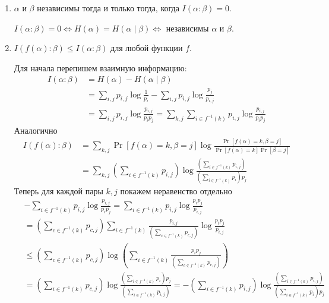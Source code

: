 \begin{prop}
\begin{enumerate}
		\item $  \alpha $ и $  \beta $ независимы тогда и только тогда, когда $ I( \alpha : \beta ) = 0$.
			\begin{proof*}
				$ I( \alpha : \beta ) = 0 \Longleftrightarrow H( \alpha ) = H( \alpha \mid \beta ) \Longleftrightarrow $ независимы $  \alpha $ и $ \beta $.
			\end{proof*}
		\item $ I( f( \alpha ) \colon \beta ) \le I ( \alpha : \beta )$ для любой функции $ f$.
		\begin{proof*}
		    Для начала перепишем взаимную информацию:
		    \begin{align*}
		        I(\alpha : \beta) &= H(\alpha) - H(\alpha \mid \beta) \\
		        &= \sum_{i,j}p_{i,j}\log\frac{1}{p_i} - \sum_{i,j}p_{i,j}\log\frac{p_j}{p_{i,j}} \\
		        &= \sum_{i,j} p_{i,j}\log\frac{p_{i,j}}{p_i p_j} = \sum_{k,j}\sum_{i\in f^{-1}(k)}p_{i,j}\log\frac{p_{i,j}}{p_i p_j}
		        \tag{сгруппировали с помощью прообразов}
		    \end{align*}
		    Аналогично
		    \begin{align*}
		        I(f(\alpha) : \beta) &= \sum_{k, j}\Pr[f(\alpha) = k, \beta = j]\log\frac{\Pr[f(\alpha) = k, \beta = j]}{\Pr[f(\alpha) = k]\Pr[\beta = j]}\\
		        &= \sum_{k,j}\left(\sum_{i \in f^{-1}(k)}p_{i,j}\right)\log\frac{\left(\sum_{i \in f^{-1}(k)}p_{i,j}\right)}{\left(\sum_{i \in f^{-1}(k)}p_{i}\right)p_j}
		    \end{align*}
		    Теперь для каждой пары $k,j$ покажем неравенство отдельно
		    \begin{align*}
		        &-\sum_{i\in f^{-1}(k)}p_{i,j}\log\frac{p_{i,j}}{p_i p_j} = \sum_{i\in f^{-1}(k)}p_{i,j}\log\frac{p_i p_j}{p_{i,j}}\\
		        &=\left(\sum_{c \in f^{-1}(k)}p_{c,j}\right)\sum_{i\in f^{-1}(k)}\frac{p_{i,j}}{\left(\sum_{c\in f^{-1}(k)}p_{c,j}\right)}\log\frac{p_i p_j}{p_{i,j}}
		        \tag{поделили и домножили для того чтобы сумма коэффициентов была 1}\\
		        &\le \left(\sum_{c\in f^{-1}(k)}p_{c,j}\right)\log\left(\sum_{i\in f^{-1}(k)}\frac{p_{i}p_j}{\left(\sum_{c\in f^{-1}(k)}p_{c,j}\right)}\right)
		        \tag{по нер-ву Йенсена}\\
		        &=\left(\sum_{i\in f^{-1}(k)}p_{c,j}\right)\log\frac{(\sum_{i\in f^{-1}(k)} p_{i})p_j}{\left(\sum_{i\in f^{-1}(k)}p_{i,j}\right)} = -\left(\sum_{i\in f^{-1}(k)}p_{i,j}\right)\log\frac{\left(\sum_{i\in f^{-1}(k)}p_{i,j}\right)}{(\sum_{i\in f^{-1}(k)} p_{i})p_j}

\end{align*}
\end{proof*}
\end{enumerate}
\end{prop}
